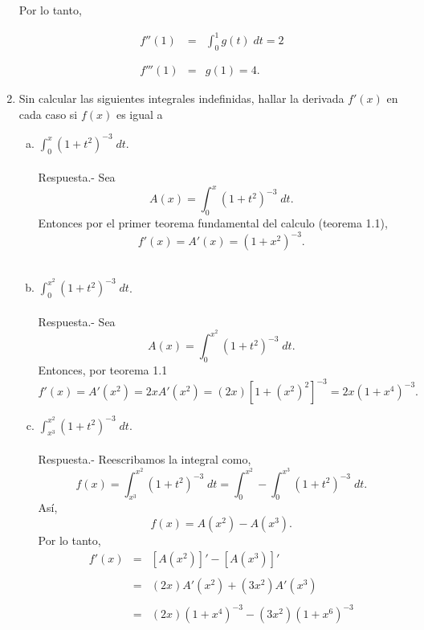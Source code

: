 \begin{enumerate}[\bfseries 1.]
	Por lo tanto,

	$$\begin{array}{rcl}
	    f''(1)&=&\displaystyle \int_0^1 g(t)\; dt=2\\\\
		  &&\\
	    f'''(1)&=&\displaystyle g(1)=4.
	\end{array}$$
	\vspace{.5cm}

    \item Sin calcular las siguientes integrales indefinidas, hallar la derivada $f'(x)$ en cada caso si $f(x)$ es igual a 
	\begin{enumerate}[(a)]

	    \item $\displaystyle\int_0^x (1+t^2)^{-3}\; dt$.\\\\ 
		Respuesta.-\; Sea $$A(x)=\int_0^x (1+t^2)^{-3}\; dt.$$
		Entonces por el primer teorema fundamental del calculo (teorema 1.1), 
		$$f'(x)=A'(x)=\left(1+x^2\right)^{-3}.$$\\

	    \item $\displaystyle\int_0^{x^2} (1+t^2)^{-3}\; dt$.\\\\ 
		Respuesta.-\; Sea $$A(x)=\int_0^{x^2} (1+t^2)^{-3}\; dt.$$
		Entonces, por teorema 1.1 
		$$f'(x)=A'\left(x^2\right)=2xA'\left(x^2\right) = (2x)\left[1+\left(x^2\right)^2\right]^{-3}=2x\left(1+x^4\right)^{-3}.$$

	    \item $\displaystyle\int_{x^3}^{x^2} (1+t^2)^{-3} \; dt$.\\\\ 
		Respuesta.-\; Reescribamos la integral como,
		$$f(x)=\int_{x^3}^{x^2}\left(1+t^2\right)^{-3}\; dt=\int_0^{x^2}-\int_0^{x^3}\left(1+t^2\right)^{-3}\; dt.$$
		Así, 
		    $$f(x)=A\left(x^2\right)-A\left(x^3\right).$$
		Por lo tanto,
		$$\begin{array}{rcl}
		    f'(x)&=&\left[A\left(x^2\right)\right]'-\left[A\left(x^3\right)\right]'\\\\
			 &=&(2x)A'\left(x^2\right) +\left(3x^2\right)A'\left(x^3\right)\\\\
			 &=&(2x)\left(1+x^4\right)^{-3}-\left(3x^2\right)\left(1+x^6\right)^{-3}
		\end{array}$$


\end{enumerate}
\end{enumerate}

